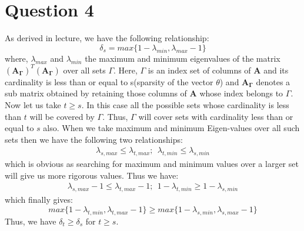 \documentclass[12pt]{article}
\begin{document}
\section*{Question 4}
As derived in lecture, we have the following relationship:
\begin{equation*}
    \delta_s = max\{1-\lambda_{min}, \lambda_{max}-1\}
\end{equation*}
where, $\lambda_{max}$ and $\lambda_{min}$ the maximum and minimum eigenvalues of the matrix
$(\boldsymbol{A_{\Gamma}})^T(\boldsymbol{A_{\Gamma}})$ over all sets $\Gamma$. Here, $\Gamma$ is an index set of columns of $\boldsymbol{A}$ and its cardinality is less than or equal to s(sparsity of the vector $\theta$) and $\boldsymbol{A_{\Gamma}}$ denotes a sub matrix obtained by retaining those columns of $\boldsymbol{A}$ whose index belongs to $\Gamma$. \\
Now let us take $t\geq s$. In this case all the possible sets whose cardinality is less than $t$ will be covered by $\Gamma$. Thus, $\Gamma$ will cover sets with cardinality less than or equal to $s$ also. When we take maximum and minimum Eigen-values over all such sets then we have the following two relationships:
\begin{align*}
    \lambda_{s, max} \leq \lambda_{t, max}; \ \ \lambda_{t, min} \leq \lambda_{s, min}
\end{align*}
which is obvious as searching for maximum and minimum values over a larger set will give us more rigorous values. Thus we have:
\begin{align*}
    \lambda_{s, max}-1 \leq \lambda_{t, max}-1; \ \ 1-\lambda_{t, min} \geq 1-\lambda_{s, min}
\end{align*}
which finally gives:
\begin{equation*}
    max\{1-\lambda_{t, min}, \lambda_{t, max}-1\} \geq max\{1-\lambda_{s, min}, \lambda_{s, max}-1\}
\end{equation*}
Thus, we have $\delta_t \geq \delta_s$ for $t \geq s$.
\end{document}
